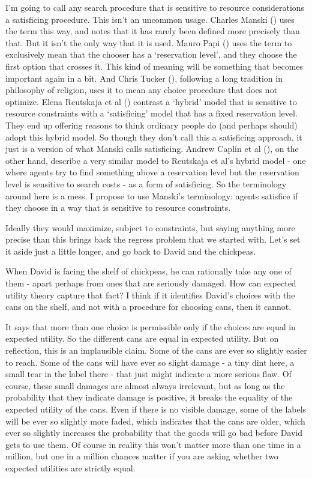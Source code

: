 \documentclass[
  10pt,
  letterpaper,
  DIV=11,
  numbers=noendperiod,
  twoside]{scrartcl}
\begin{document}
I'm going to call any search procedure that is sensitive to resource
considerations a satisficing procedure. This isn't an uncommon usage.
Charles Manski () uses the term this way,
and notes that it has rarely been defined more precisely than that. But
it isn't the only way that it is used. Mauro Papi
() uses the term to exclusively mean that
the chooser has a `reservation level', and they choose the first option
that crosses it. This kind of meaning will be something that becomes
important again in a bit. And Chris Tucker
(), following a long tradition in
philosophy of religion, uses it to mean any choice procedure that does
not optimize. Elena Reutskaja et al ()
contrast a `hybrid' model that is sensitive to resource constraints with
a `satisficing' model that has a fixed reservation level. They end up
offering reasons to think ordinary people do (and perhaps should) adopt
this hybrid model. So though they don't call this a satisficing
approach, it just is a version of what Manski calls satisficing. Andrew
Caplin et al (), on the other hand,
describe a very similar model to Reutskaja et al's hybrid model - one
where agents try to find something above a reservation level but the
reservation level is sensitive to search costs - as a form of
satisficing. So the terminology around here is a mess. I propose to use
Manski's terminology: agents satisfice if they choose in a way that is
sensitive to resource constraints.

Ideally they would maximize, subject to constraints, but saying anything
more precise than this brings back the regress problem that we started
with. Let's set it aside just a little longer, and go back to David and
the chickpeas.

When David is facing the shelf of chickpeas, he can rationally take any
one of them - apart perhaps from ones that are seriously damaged. How
can expected utility theory capture that fact? I think if it identifies
David's choices with the cans on the shelf, and not with a procedure for
choosing cans, then it cannot.

It says that more than one choice is permissible only if the choices are
equal in expected utility. So the different cans are equal in expected
utility. But on reflection, this is an implausible claim. Some of the
cans are ever so slightly easier to reach. Some of the cans will have
ever so slight damage - a tiny dint here, a small tear in the label
there - that just might indicate a more serious flaw. Of course, these
small damages are almost always irrelevant, but as long as the
probability that they indicate damage is positive, it breaks the
equality of the expected utility of the cans. Even if there is no
visible damage, some of the labels will be ever so slightly more faded,
which indicates that the cans are older, which ever so slightly
increases the probability that the goods will go bad before David gets
to use them. Of course in reality this won't matter more than one time
in a million, but one in a million chances matter if you are asking
whether two expected utilities are strictly equal.
\end{document}
